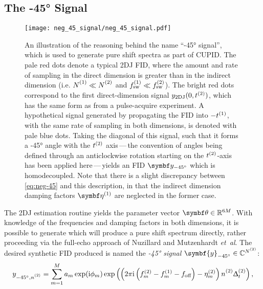 \subsection{The \ang{-45} Signal}
\begin{figure}
    \centering
    \texttt{[image: neg\_45\_signal/neg\_45\_signal.pdf]}
    \caption[
        An illustration of the reasoning behind the name ``\ang{-45}
        signal'', which is used to generate pure shift spectra as part of
        \acs{CUPID}.
    ]{
        An illustration of the reasoning behind the name ``\ang{-45}
        signal'', which is used to generate pure shift spectra as part of
        \ac{CUPID}. The pale red
        dots denote
        a typical \ac{2DJ} \ac{FID}, where
        the amount and rate of sampling in the direct dimension is greater than
        in the indirect dimension (i.e. $\None \ll \Ntwo$ and $f_{\mathrm{sw}}^{(1)} \ll
        f_{\mathrm{sw}}^{(2)}$). The bright red dots correspond to the first direct-dimension
        signal $y_{\text{2DJ}}(0,t^{(2)})$, which has the same form as
         from a pulse-acquire experiment. A hypothetical signal
        generated by propagating the \ac{FID} into $-t^{(1)}$, with the same rate
        of sampling in both dimensions, is denoted with pale blue dots. Taking
        the diagonal of this signal, such that it forms a \ang{-45} angle with the
        $t^{(2)}$ axis\,---\,the convention of angles being defined through an
        anticlockwise rotation starting on the $t^{(2)}$-axis has been applied
        here\,---\,yields an \ac{FID}
        $\by_{\ang{-45}}$  which is
        homodecoupled. Note that there is a slight discrepancy
        between \cref{eq:neg-45} and this description, in that the
        indirect dimension damping factors $\bdetaone$ are neglected in the
        former case.
    }
    \label{fig:neg-45}
\end{figure}
The \ac{2DJ} estimation routine yields the parameter vector $\bth \in
\mathbb{R}^{6M}$. With
knowledge of the frequencies and damping factors in both dimensions, it is
possible to generate  which will produce a pure shift spectrum
directly, rather proceeding via the full-echo approach of Nuzillard and
Mutzenhardt \emph{et~al}.
The desired synthetic \ac{FID} produced is named the \emph{\ang{-45} signal}
$\symbf{y}_{\ang{-45}} \in \mathbb{C}^{\Ntwo}$:
\begin{equation}
    y_{\ang{-45},\ntwo} =
        \sum_{m=1}^{M} a_m \exp (\iu \phi_m)
        \exp\left(\left(2 \pi \iu \left(\ftwo_m - \fone_m - \foff\right)
                - \etatwo_m
            \right) \ntwo \Dttwo
        \right),
    \label{eq:neg-45}
\end{equation}
